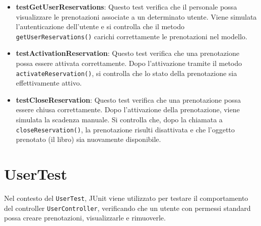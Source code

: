 \documentclass[twoside,openright,titlepage,fleqn,headinclude,12pt,a4paper,BCOR=5mm,footinclude]{scrbook}
\begin{document}
\begin{itemize}
    \item \textbf{testGetUserReservations}: Questo test verifica che il personale possa visualizzare le prenotazioni associate a un determinato utente. Viene simulata l’autenticazione dell’utente e si controlla che il metodo \texttt{getUserReservations()} carichi correttamente le prenotazioni nel modello.

    \item \textbf{testActivationReservation}: Questo test verifica che una prenotazione possa essere attivata correttamente. Dopo l’attivazione tramite il metodo \texttt{activateReservation()}, si controlla che lo stato della prenotazione sia effettivamente attivo.

    \item \textbf{testCloseReservation}: Questo test verifica che una prenotazione possa essere chiusa correttamente. Dopo l’attivazione della prenotazione, viene simulata la scadenza manuale. Si controlla che, dopo la chiamata a \texttt{closeReservation()}, la prenotazione risulti disattivata e che l’oggetto prenotato (il libro) sia nuovamente disponibile.
\end{itemize}

\bigskip

\section{UserTest}

Nel contesto del \texttt{UserTest}, JUnit viene utilizzato per testare il comportamento del controller \texttt{UserController}, verificando che un utente con permessi standard possa creare prenotazioni, visualizzarle e rimuoverle.
\end{document}
